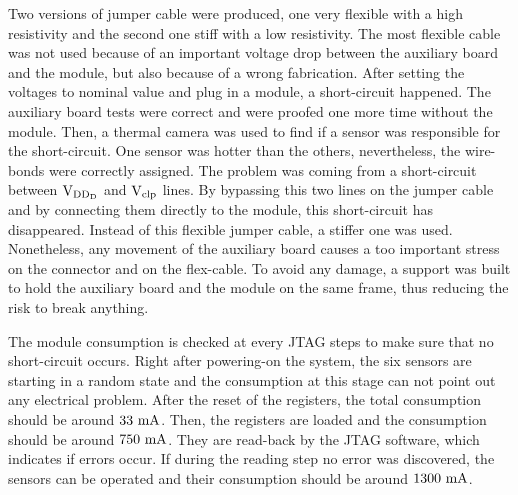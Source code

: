   Two versions of jumper cable were produced, one very flexible with a high resistivity and the second one stiff with a low resistivity.
  The most flexible cable was not used because of an important voltage drop between the auxiliary board and the module, but also because of a wrong fabrication.
  After setting the voltages to nominal value and plug in a module, a short-circuit happened.
  The auxiliary board tests were correct and were proofed one more time without the module.
  Then, a thermal camera was used to find if a sensor was responsible for the short-circuit.
  One sensor was hotter than the others, nevertheless, the wire-bonds were correctly assigned.
  The problem was coming from a short-circuit between $\rm{V}_{\rm{DD_D}}$ and $\rm{V}_{\rm{clp}}$ lines.
  By bypassing this two lines on the jumper cable and by connecting them directly to the module, this short-circuit has disappeared.
  Instead of this flexible jumper cable, a stiffer one was used.
  Nonetheless, any movement of the auxiliary board causes a too important stress on the connector and on the flex-cable.
  To avoid any damage, a support was built to hold the auxiliary board and the module on the same frame, thus reducing the risk to break anything.

  The module consumption is checked at every \gls{JTAG} steps to make sure that no short-circuit occurs.
  Right after powering-on the system, the six sensors are starting in a random state and the consumption at this stage can not point out any electrical problem.
  After the reset of the registers, the total consumption should be around $33~\rm{mA}$.
  Then, the registers are loaded and the consumption should be around $750~\rm{mA}$.
  They are read-back by the \gls{JTAG} software, which indicates if errors occur.
  If during the reading step no error was discovered, the sensors can be operated and their consumption should be around $1300~\rm{mA}$.



